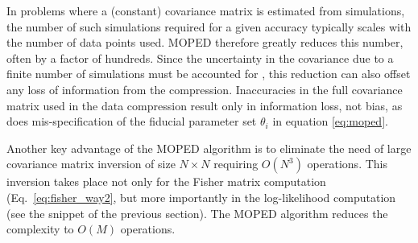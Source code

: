 \documentclass[twocolumn,twocolappendix,nofootinbib,iop]{openjournal}
\newcommand{\FrL}[1]{{\color{cyan}FL: #1}}
\begin{document}
In problems where a (constant) covariance matrix is estimated from simulations, the number of such simulations required for a given accuracy typically scales with the number of data points used. 
MOPED therefore greatly reduces this number, often by a factor of hundreds. Since the uncertainty in the covariance due to a finite number of simulations must be accounted for \citep{2018MNRAS.473.2355S,2007A&A...464..399H}, this reduction can also offset any loss of information from the compression. Inaccuracies in the full covariance matrix used in the data compression result only in information loss, not bias, as does mis-specification of the fiducial parameter set $\theta_i$ in equation \ref{eq:moped}.



Another key advantage of the MOPED algorithm is to eliminate the need of large covariance matrix inversion of size $N\times N$ requiring $O(N^3)$ operations. This inversion takes place not only for the Fisher matrix computation (Eq.~\ref{eq:fisher_way2}, but more importantly in the log-likelihood computation (see the snippet of the previous section). The MOPED algorithm reduces the complexity to $O(M)$ operations.
\end{document}
